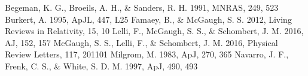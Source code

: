 \documentclass[RNAAS]{aastex701}
\begin{document}
\begin{thebibliography}{}
 Begeman, K. G., Broeils, A. H., \& Sanders, R. H. 1991, MNRAS, 249, 523
 Burkert, A. 1995, ApJL, 447, L25
 Famaey, B., \& McGaugh, S. S. 2012, Living Reviews in Relativity, 15, 10
 Lelli, F., McGaugh, S. S., \& Schombert, J. M. 2016, AJ, 152, 157
 McGaugh, S. S., Lelli, F., \& Schombert, J. M. 2016, Physical Review Letters, 117, 201101
 Milgrom, M. 1983, ApJ, 270, 365
 Navarro, J. F., Frenk, C. S., \& White, S. D. M. 1997, ApJ, 490, 493
\end{thebibliography}
\end{document}
